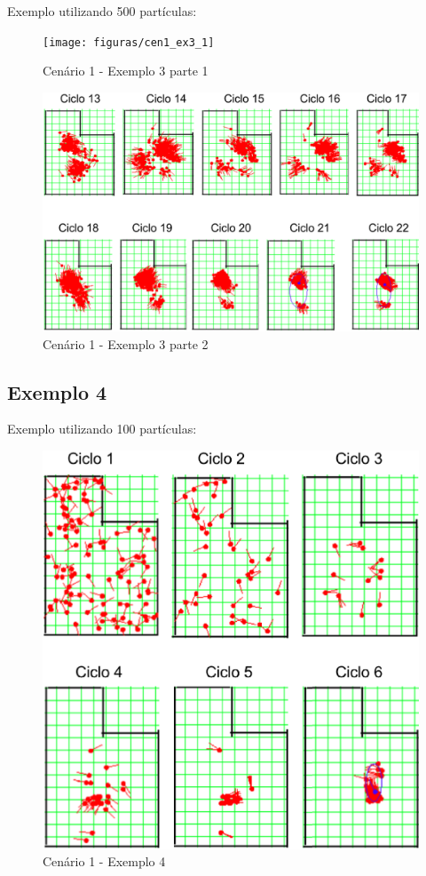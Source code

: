 Exemplo utilizando 500 partículas:

\begin{figure}[H]
  \centering
  \texttt{[image: figuras/cen1\_ex3\_1]}
  \caption[Cenário 1 - Exemplo 3]{Cenário 1 - Exemplo 3 parte 1}
  \label{img:cen1_ex3_1}
\end{figure}

\begin{figure}[H]
  \centering
  \includegraphics[scale=0.5]{figuras/cen1_ex3_2}
  \caption[Cenário 1 - Exemplo 3]{Cenário 1 - Exemplo 3 parte 2}
  \label{img:cen1_ex3_2}
\end{figure}


\subsection{Exemplo 4}

Exemplo utilizando 100 partículas:

\begin{figure}[H]
  \centering
  \includegraphics[scale=0.5]{figuras/cen1_ex4}
  \caption[Cenário 1 - Exemplo 4]{Cenário 1 - Exemplo 4}
  \label{img:cen1_ex4}
\end{figure}

